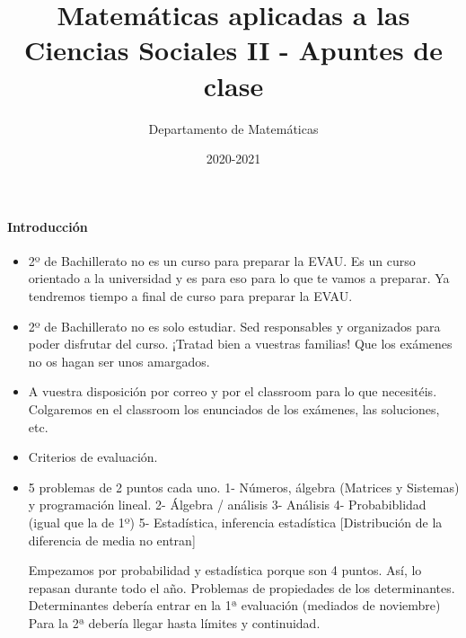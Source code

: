 \documentclass[nobuilddate]{Docencia}
\title{Matemáticas aplicadas a las Ciencias Sociales II - Apuntes de clase}
\author{Departamento de Matemáticas}
\date{2020-2021}
\begin{document}
\pagestyle{plain}
\maketitle
\tableofcontents
\newpage

\newcommand{\hide}[1]{#1}

\renewcommand{\vec}[1]{\overrightarrow{#1}}

\paragraph{Introducción}

\begin{itemize}
    \item 2º de Bachillerato no es un curso para preparar la EVAU. Es un curso orientado a la universidad y es para eso para lo que te vamos a preparar. 
    Ya tendremos tiempo a final de curso para preparar la EVAU.
    
    \item 2º de Bachillerato no es solo estudiar. Sed responsables y organizados para poder disfrutar del curso. ¡Tratad bien a vuestras familias! Que los exámenes no os hagan ser unos amargados.
    
    \item A vuestra disposición por correo y por el classroom para lo que necesitéis. Colgaremos en el classroom los enunciados de los exámenes, las soluciones, etc.
    
    \item Criterios de evaluación. 

    \item 

    5 problemas de 2 puntos cada uno.
1-  Números, álgebra (Matrices y Sistemas) y programación lineal.
2-  Álgebra / análisis
3-  Análisis
4-  Probabiblidad (igual que la de 1º)
5-  Estadística, inferencia estadística [Distribución de la diferencia de media no entran]

Empezamos por probabilidad y estadística porque son 4 puntos. Así, lo repasan durante todo el año.
Problemas de propiedades de los determinantes.
Determinantes debería entrar en la 1ª evaluación (mediados de noviembre)
Para la 2ª debería llegar hasta límites y continuidad.

\end{itemize}



%
%


\newpage
\printindex
\listoffigures
\listoftables
\end{document}
